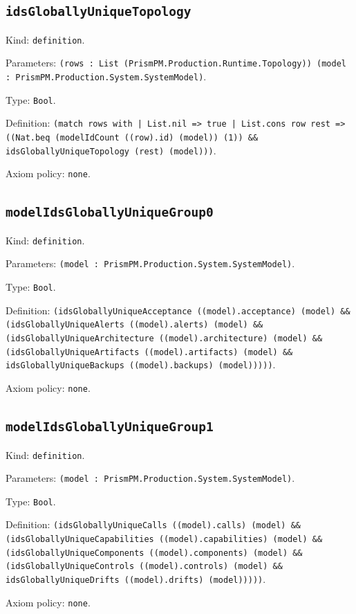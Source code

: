 \documentclass[11pt]{article}
\begin{document}
\subsection*{\texttt{idsGloballyUniqueTopology}}
\noindent Kind: \texttt{definition}.\par
\noindent Parameters: \texttt{(rows : List (PrismPM.Production.Runtime.Topology)) (model : PrismPM.Production.System.SystemModel)}.\par
\noindent Type: \texttt{Bool}.\par
\noindent Definition: \texttt{(match rows with | List.nil => true | List.cons row rest => ((Nat.beq (modelIdCount ((row).id) (model)) (1)) \&\& idsGloballyUniqueTopology (rest) (model)))}.\par
\noindent Axiom policy: \texttt{none}.\par
\subsection*{\texttt{modelIdsGloballyUniqueGroup0}}
\noindent Kind: \texttt{definition}.\par
\noindent Parameters: \texttt{(model : PrismPM.Production.System.SystemModel)}.\par
\noindent Type: \texttt{Bool}.\par
\noindent Definition: \texttt{(idsGloballyUniqueAcceptance ((model).acceptance) (model) \&\& (idsGloballyUniqueAlerts ((model).alerts) (model) \&\& (idsGloballyUniqueArchitecture ((model).architecture) (model) \&\& (idsGloballyUniqueArtifacts ((model).artifacts) (model) \&\& idsGloballyUniqueBackups ((model).backups) (model)))))}.\par
\noindent Axiom policy: \texttt{none}.\par
\subsection*{\texttt{modelIdsGloballyUniqueGroup1}}
\noindent Kind: \texttt{definition}.\par
\noindent Parameters: \texttt{(model : PrismPM.Production.System.SystemModel)}.\par
\noindent Type: \texttt{Bool}.\par
\noindent Definition: \texttt{(idsGloballyUniqueCalls ((model).calls) (model) \&\& (idsGloballyUniqueCapabilities ((model).capabilities) (model) \&\& (idsGloballyUniqueComponents ((model).components) (model) \&\& (idsGloballyUniqueControls ((model).controls) (model) \&\& idsGloballyUniqueDrifts ((model).drifts) (model)))))}.\par
\noindent Axiom policy: \texttt{none}.\par
\end{document}
